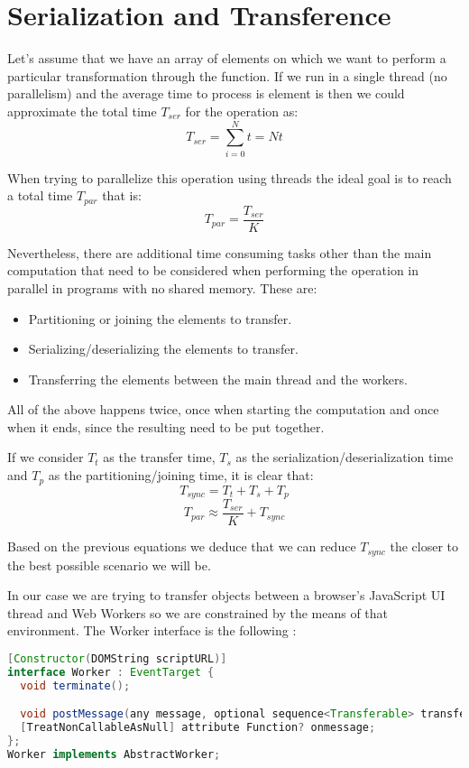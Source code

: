 \section{Serialization and Transference}
\label{sec:serialization-and-transference}

Let's assume that we have an array of  elements on which we want to perform a particular transformation through the  function. If we run in a single thread (no parallelism) and the average time to process is element is  then we could approximate the total time \(T_{ser}\) for the operation as:
\[T_{ser} = \sum_{i = 0}^{N}t = Nt\]

When trying to parallelize this operation using  threads the ideal goal is to reach a total time \(T_{par}\) that is:
\[T_{par} = \frac{T_{ser}}{K}\]

Nevertheless, there are additional time consuming tasks other than the main computation that need to be considered when performing the operation in parallel in programs with no shared memory. These are:
\begin{itemize}
  \item Partitioning or joining the elements to transfer.
  \item Serializing/deserializing the elements to transfer.
  \item Transferring the elements between the main thread and the workers.
\end{itemize}

All of the above happens twice, once when starting the computation and once when it ends, since the resulting need to be put together.

If we consider \(T_{t}\) as the transfer time, \(T_{s}\) as the serialization/deserialization time and \(T_{p}\) as the partitioning/joining time, it is clear that:
\[T_{sync} = T_{t} + T_{s} + T_{p}\]
\[T_{par} \approx \frac{T_{ser}}{K} + T_{sync}\]

Based on the previous equations we deduce that we can reduce \(T_{sync}\) the closer to the best possible scenario we will be.

In our case we are trying to transfer objects between a browser's JavaScript UI thread and Web Workers so we are constrained by the means of that environment. The Worker interface is the following \cite{w3c-ww}:
\begin{lstlisting}[language=Java, caption=The Worker interface]
[Constructor(DOMString scriptURL)]
interface Worker : EventTarget {
  void terminate();

  void postMessage(any message, optional sequence<Transferable> transfer);
  [TreatNonCallableAsNull] attribute Function? onmessage;
};
Worker implements AbstractWorker;
\end{lstlisting}

